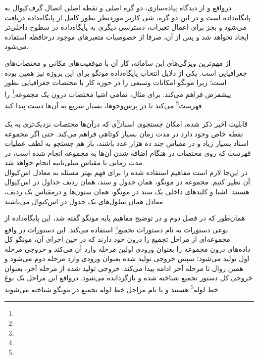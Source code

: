 درواقع و از دیدگاه پیاده‌سازی، دو گره اصلی  و  نقطه اصلی اتصال گرف‌کیوال به پایگاه‌داده است و در این دو گره، شی کاربر موردنظر بطور کامل از پایگاه‌داده دریافت می‌شود و بجز برای اعمال تغیرات، دسترسی دیگری به پایگاه‌داده در سطوح داخلی‌تر ایجاد نخواهد شد و پس از آن، صرفا از خصوصیات متغیرهای موجود درحافظه استفاده می‌شود. 

\newpage


از مهم‌ترین ویژگی‌های این سامانه، کار آن با موقعیت‌های مکانی و مختصات‌های جغرافیایی است. یکی از دلایل انتخاب پایگاه‌داده مونگو برای این پروژه نیز همین بوده است؛ زیرا مونگو امکانات وسیعی را در حوزه کار با مختصات جغرافیایی بطور پیشفرض فراهم می‌کند. برای مثال، تمامی اشیا مختصات درون یک مجموعه\footnote{} را فهرست\footnote{} می‌کند تا در پرس‌وجوها، بسیار سریع به آن‌ها دست پیدا کند.

قابلیت اخیر ذکر شده، امکان جستجوی اسناد\footnote{}ی که درآن‌ها مختصات نزدیک‌تری به یک نقطه خاص وجود دارد در مدت زمان بسیار کوتاهی فراهم می‌کند. حتی اگر مجموعه اسناد بسیار زیاد و در مقیاس چند ده هزار عدد باشند، باز هم جستجو به لطف عملیات فهرست که روی مختصات در هنگام اضافه شدن آن‌ها به مجموعه انجام شده است، در مدت زمانی با مقیاس میلی‌ثانیه انجام خواهد شد.\\

در این‌جا لازم است مفاهیم استفاده شده را برای فهم بهتر مسئله به معادل اس‌کیوال آن نظیر کنیم. مجموعه در مونگو،‌ همان جدول و سند، همان ردیف جداول در اس‌کیوال هستند. اشیا و کلیدهای داخلی یک سند در مونگو، همان ستون‌ها و درمقیاس یک ردیف، معادل همان سلول‌های یک جدول در اس‌کیوال می‌باشند.

همان‌طور که در فصل دوم و در توضیح مفاهیم پایه مونگو گفته شد، این پایگاه‌داده از نوعی دستورات به نام دستورات تجمیع\footnote{} استفاده می‌کند. این دستورات در واقع مجموعه‌ای از مراحل تجمیع را درون خود دارند که در حین اجرای آن، مونگو کل داده‌های درون مجموعه را بعنوان ورودی اولین مرحله وارد آن می‌کند و خروجی مرحله اول تولید می‌شود؛ سپس خروجی تولید شده بعنوان ورودی وارد مرحله دوم می‌شود و همین روال تا مرحله آخر ادامه پیدا می‌کند. خروجی تولید شده از مرحله آخر،‌ بعنوان خروجی کل دستور تجمیع شناخته شده و بازگردانده می‌شود. درواقع این مراحل یک نوع خط لوله\footnote{} هستند و با نام مراحل خط لوله تجمیع در مونگو شناخته می‌شوند.

\newpage


